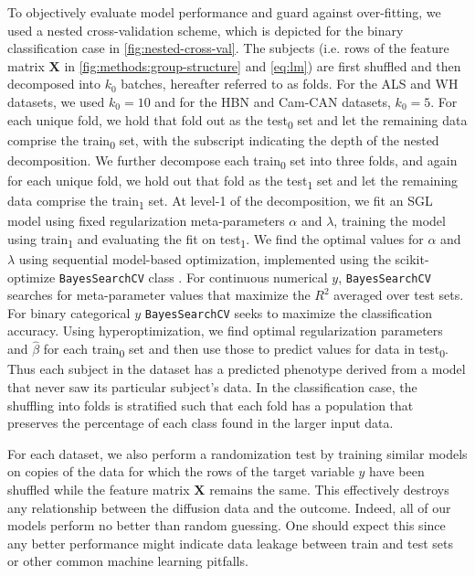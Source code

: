 \documentclass[10pt,letterpaper]{article}
\begin{document}
To objectively evaluate model performance and guard against over-fitting,
we used a nested cross-validation scheme, which is depicted for the binary
classification case in \cref{fig:nested-cross-val}. The subjects (i.e. rows
of the feature matrix $\mathbf{X}$ in \cref{fig:methods:group-structure}
and \cref{eq:lm}) are first shuffled and then decomposed into $k_0$ batches,
hereafter referred to as folds. For the ALS and WH datasets, we used $k_0 =
10$ and for the HBN and Cam-CAN datasets, $k_0 = 5$. For each unique fold, we
hold that fold out as the test\textsubscript{0} set and let the remaining
data comprise the train\textsubscript{0} set, with the subscript indicating
the depth of the nested decomposition. We further decompose each
train\textsubscript{0} set into three folds, and again for each unique fold,
we hold out that fold as the test\textsubscript{1} set and let the remaining
data comprise the train\textsubscript{1} set. At level-1 of the
decomposition, we fit an SGL model using fixed regularization meta-parameters
$\alpha$ and $\lambda$, training the model using train\textsubscript{1} and
evaluating the fit on test\textsubscript{1}. We find the optimal values for
$\alpha$ and $\lambda$ using sequential model-based optimization, implemented
using the scikit-optimize \verb|BayesSearchCV| class \cite{scikit_optimize}.
For continuous numerical $y$, \verb|BayesSearchCV| searches for
meta-parameter values that maximize the $R^2$ averaged over test sets. For
binary categorical $y$ \verb|BayesSearchCV| seeks to maximize the
classification accuracy. Using hyperoptimization, we find optimal
regularization parameters and $\hat{\beta}$ for each train\textsubscript{0}
set and then use those to predict values for data in test\textsubscript{0}.
Thus each subject in the dataset has a predicted phenotype derived from a
model that never saw its particular subject's data. In the classification
case, the shuffling into folds is stratified such that each fold has a
population that preserves the percentage of each class found in the larger
input data.

For each dataset, we also perform a randomization test by training similar
models on copies of the data for which the rows of the target variable $y$
have been shuffled while the feature matrix $\mathbf{X}$ remains the same.
This effectively destroys any relationship between the diffusion data and the
outcome. Indeed, all of our models perform no better than random guessing.
One should expect this since any better performance might indicate data
leakage between train and test sets \cite{kaufman2012leakage} or other common
machine learning pitfalls.
\end{document}

